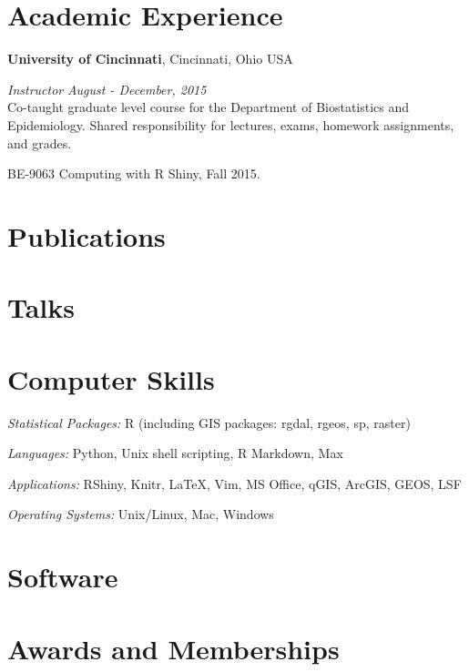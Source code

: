 \documentclass[margin,line]{res}
\newenvironment{list2}{
  \begin{list}{}{%
      \setlength{\itemsep}{0in}
      \setlength{\parsep}{0in} \setlength{\parskip}{0in}
      \setlength{\topsep}{0in} \setlength{\partopsep}{0in} 
      \setlength{\leftmargin}{0.4in}}}{\end{list}}
\newenvironment{list3}{
  \begin{list}{}{%
      \setlength{\itemsep}{0in}
      \setlength{\parsep}{0in} \setlength{\parskip}{0in}
      \setlength{\topsep}{0in} \setlength{\partopsep}{0in} 
      \setlength{\leftmargin}{0in}}}{\end{list}}
\begin{document}
\begin{resume}
\section{\sc Academic Experience}
{\bf University of Cincinnati}, Cincinnati, Ohio USA

{\em Instructor} \hfill \textit{August - December, 2015}\\
Co-taught graduate level course for the Department of Biostatistics and Epidemiology.  Shared responsibility for lectures, exams,
homework assignments, and  grades.  
\vspace*{.05in}  
\begin{list2}
\item BE-9063 Computing with R Shiny, Fall 2015.
\end{list2}



\section{\sc Publications}


\section{\sc Talks}


\section{\sc Computer Skills} 

\begin{list3} \itemsep 4pt
\item[] \textit{Statistical Packages:}  R (including GIS packages: rgdal, rgeos, sp, raster)
\item[] \textit{Languages:} Python, Unix shell scripting, R Markdown, Max
\item[] \textit{Applications:} RShiny, Knitr, \LaTeX, Vim, MS Office, qGIS, ArcGIS, GEOS, LSF 
\item[] \textit{Operating Systems:}  Unix/Linux, Mac, Windows\\ 
\end{list3}

\section{\sc Software}


\section{\sc Awards and Memberships} 


\end{resume}
\end{document}
